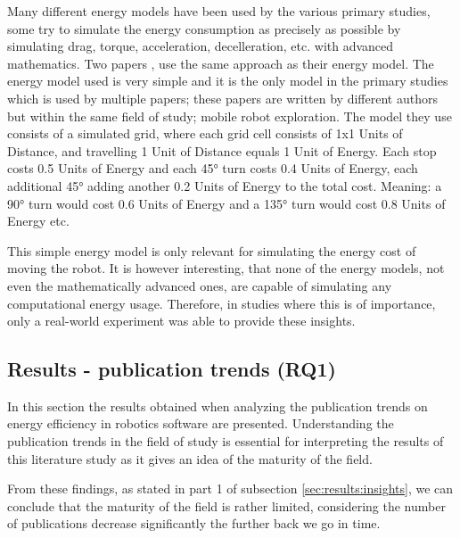 Many different energy models have been used by the various primary studies, some try to simulate the energy consumption 
as precisely as possible by simulating drag, torque, acceleration, decelleration, etc. with advanced mathematics. 
Two papers \cite{patel2012exploration_strategy, mei2006mobile_exploration}, use the same approach as their energy model.
The energy model used is very simple and it is the only model in the primary studies which is used by multiple papers;
these papers are written by different authors but within the same field of study; mobile robot exploration.
The model they use consists of a simulated grid, where each grid cell consists of 1x1 Units of Distance, 
and travelling 1 Unit of Distance equals 1 Unit of Energy.
Each stop costs 0.5 Units of Energy and each 45° turn costs 0.4 Units of Energy, each additional 45° adding another 
0.2 Units of Energy to the total cost.
Meaning: a 90° turn would cost 0.6 Units of Energy and a 135° turn would cost 0.8 Units of Energy etc.

\vspace{2mm}

This simple energy model is only relevant for simulating the energy cost of moving the robot.
It is however interesting, that none of the energy models, not even the mathematically advanced ones, are capable of 
simulating any computational energy usage.
Therefore, in studies where this is of importance, only a real-world experiment was able to provide these insights.


\subsection{Results - publication trends (RQ1)}
\label{sec:results:rq1_pub_trends}

In this section the results obtained when analyzing the publication trends on energy efficiency in robotics software are presented.
Understanding the publication trends in the field of study is essential for interpreting the results of this literature study as it gives
an idea of the maturity of the field. 

\vspace{2mm}

From these findings, as stated in part 1 of subsection \ref{sec:results:insights}, we can conclude that the maturity of the field is rather limited,
considering the number of publications decrease significantly the further back we go in time.

